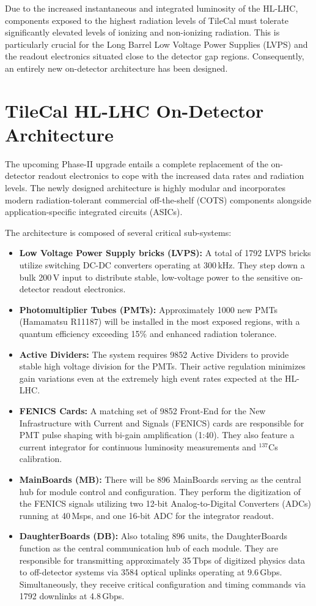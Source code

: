 \documentclass[a4paper,11pt]{article}
\begin{document}
Due to the increased instantaneous and integrated luminosity of the HL-LHC, components exposed to the highest radiation levels of TileCal must tolerate significantly elevated levels of ionizing and non-ionizing radiation. This is particularly crucial for the Long Barrel Low Voltage Power Supplies (LVPS) and the readout electronics situated close to the detector gap regions. Consequently, an entirely new on-detector architecture has been designed. 

\section{TileCal HL-LHC On-Detector Architecture}
\label{sec:architecture}

The upcoming Phase-II upgrade entails a complete replacement of the on-detector readout electronics to cope with the increased data rates and radiation levels. The newly designed architecture is highly modular and incorporates modern radiation-tolerant commercial off-the-shelf (COTS) components alongside application-specific integrated circuits (ASICs).

The architecture is composed of several critical sub-systems:
\begin{itemize}
    \item \textbf{Low Voltage Power Supply bricks (LVPS):} A total of 1792 LVPS bricks utilize switching DC-DC converters operating at 300\,kHz. They step down a bulk 200\,V input to distribute stable, low-voltage power to the sensitive on-detector readout electronics. 
    \item \textbf{Photomultiplier Tubes (PMTs):} Approximately 1000 new PMTs (Hamamatsu R11187) will be installed in the most exposed regions, with a quantum efficiency exceeding 15\% and enhanced radiation tolerance.
    \item \textbf{Active Dividers:} The system requires 9852 Active Dividers to provide stable high voltage division for the PMTs. Their active regulation minimizes gain variations even at the extremely high event rates expected at the HL-LHC.
    \item \textbf{FENICS Cards:} A matching set of 9852 Front-End for the New Infrastructure with Current and Signals (FENICS) cards are responsible for PMT pulse shaping with bi-gain amplification (1:40). They also feature a current integrator for continuous luminosity measurements and $^{137}$Cs calibration.
    \item \textbf{MainBoards (MB):} There will be 896 MainBoards serving as the central hub for module control and configuration. They perform the digitization of the FENICS signals utilizing two 12-bit Analog-to-Digital Converters (ADCs) running at 40\,Msps, and one 16-bit ADC for the integrator readout.
    \item \textbf{DaughterBoards (DB):} Also totaling 896 units, the DaughterBoards function as the central communication hub of each module. They are responsible for transmitting approximately 35\,Tbps of digitized physics data to off-detector systems via 3584 optical uplinks operating at 9.6\,Gbps. Simultaneously, they receive critical configuration and timing commands via 1792 downlinks at 4.8\,Gbps.
\end{itemize}
\end{document}
